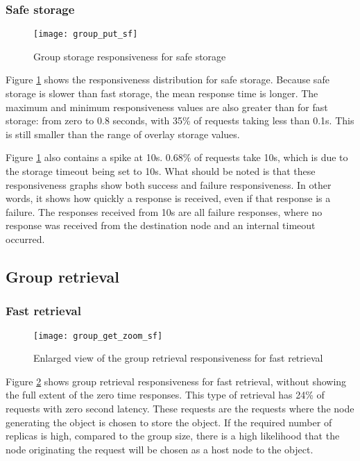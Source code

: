 \subsubsection{Safe storage}
\begin{figure}[htbp]
 \centering
 \texttt{[image: group\_put\_sf]}
 \caption{Group storage responsiveness for safe storage}
 \label{fig_group_put_sf}
\end{figure}
%
Figure \ref{fig_group_put_sf} shows the responsiveness distribution for safe storage. Because safe storage is slower than fast storage, the mean response time is longer. The maximum and minimum responsiveness values are also greater than for fast storage: from zero to 0.8 seconds, with 35\% of requests taking less than 0.1s. This is still smaller than the range of overlay storage values.

Figure \ref{fig_group_put_sf} also contains a spike at 10s. 0.68\% of requests take 10s, which is due to the storage timeout being set to 10s. What should be noted is that these responsiveness graphs show both success and failure responsiveness. In other words, it shows how quickly a response is received, even if that response is a failure. The responses received from 10s are all failure responses, where no response was received from the destination node and an internal timeout occurred.

\subsection{Group retrieval}
\label{group_retrieve_eval}

\subsubsection{Fast retrieval}

\begin{figure}[htbp]
 \centering
 \texttt{[image: group\_get\_zoom\_sf]}
 \caption{Enlarged view of the group retrieval responsiveness for fast retrieval}
 \label{fig_group_get_zoom_sf}
\end{figure}
%
Figure \ref{fig_group_get_zoom_sf} shows group retrieval responsiveness for fast retrieval, without showing the full extent of the zero time responses. This type of retrieval has 24\% of requests with zero second latency. These requests are the requests where the node generating the object is chosen to store the object. If the required number of replicas is high, compared to the group size, there is a high likelihood that the node originating the request will be chosen as a host node to the object.

